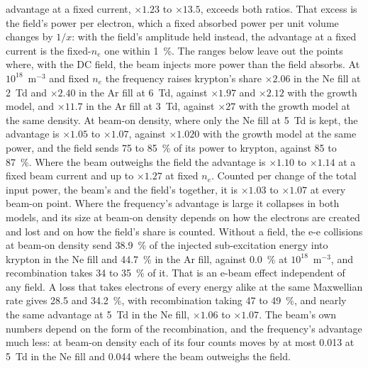 \documentclass[11pt]{article}
\numberwithin{equation}{section}
\begin{document}
advantage at a fixed current, $\times1.23$ to $\times13.5$, exceeds both ratios. That
excess is the field's power per electron, which a fixed absorbed power per unit volume
changes by $1/x$: with the field's amplitude held instead, the advantage at a fixed
current is the fixed-$n_e$ one within 1~\%. The ranges below
leave out the points where, with the DC field, the beam injects more power than the
field absorbs. At $10^{18}$~m$^{-3}$ and fixed $n_e$ the frequency raises krypton's share $\times2.06$
in the Ne fill at 2~Td and $\times2.40$ in the Ar fill at 6~Td, against $\times1.97$ and
$\times2.12$ with the growth model, and $\times11.7$ in the Ar fill at 3~Td, against
$\times27$ with the growth model at the same density. At beam-on density, where only the
Ne fill at 5~Td is kept, the advantage is $\times1.05$ to $\times1.07$, against $\times1.020$
with the growth model at the same power, and the field sends 75 to 85~\% of its power to
krypton, against 85 to 87~\%. Where the beam outweighs the field the advantage is
$\times1.10$ to $\times1.14$ at a fixed beam current and up to $\times1.27$ at fixed
$n_e$. Counted per change of the total input power, the beam's and
the field's together, it is $\times1.03$ to $\times1.07$ at every beam-on point. Where the frequency's
advantage is large it collapses in both models, and its size
at beam-on density depends on how the electrons are created and lost and on how the
field's share is counted. Without a field, the e-e collisions at beam-on density send
38.9~\% of the injected sub-excitation energy into krypton in the Ne fill and 44.7~\% in
the Ar fill, against 0.0~\% at $10^{18}$~m$^{-3}$, and recombination takes 34 to 35~\%
of it. That is an e-beam effect independent of any field. A loss that takes electrons
of every energy alike at the
same Maxwellian rate gives 28.5 and 34.2~\%, with recombination taking 47 to 49~\%, and
nearly the same advantage at 5~Td in the Ne fill, $\times1.06$ to $\times1.07$. The
beam's own numbers depend on the form of the recombination, and the frequency's
advantage much less: at beam-on density each of its four counts moves by at most 0.013
at 5~Td in the Ne fill and 0.044 where the beam outweighs the field.
\end{document}
